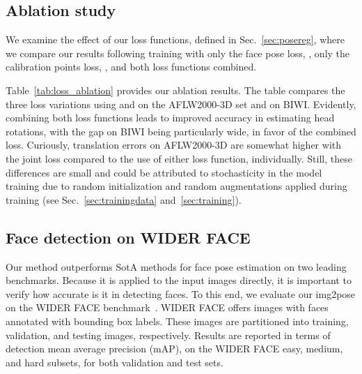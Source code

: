 \documentclass[final]{cvpr}
\begin{document}
\subsection{Ablation study}\label{sec:append:ablation}
We examine the effect of our loss functions, defined in Sec.~\ref{sec:posereg}, where we compare our results following training with only the face pose loss, , only the calibration points loss, , and both loss functions combined.

Table~\ref{tab:loss_ablation} provides our ablation results. The table compares the three loss variations using  and  on the AFLW2000-3D set and  on BIWI. Evidently, combining both loss functions leads to improved accuracy in estimating head rotations, with the gap on BIWI being particularly wide, in favor of the combined loss. Curiously, translation errors on AFLW2000-3D are somewhat higher with the joint loss compared to the use of either loss function, individually. Still, these differences are small and could be attributed to stochasticity in the model training due to random initialization and random augmentations applied during training (see Sec.~\ref{sec:trainingdata} and~\ref{sec:training}).

\begin{table}[t]
    \centering
    \caption{Comparison of the effects of different loss functions on the pose estimation results obtained on the AFLW2000-3D and BIWI benchmarks. MAE and MAE are the rotational and translational MAE, respectively.}
    \label{tab:loss_ablation}\vspace{-5mm}
\end{table}

\subsection{Face detection on WIDER FACE}\label{sec:WIDER}
Our method outperforms SotA methods for face pose estimation on two leading benchmarks. Because it is applied to the input images directly, it is important to verify how accurate is it in detecting faces. To this end, we evaluate our img2pose on the WIDER FACE benchmark~\cite{wider_face}. WIDER FACE offers  images with  faces annotated with bounding box labels. These images are partitioned into  training,  validation, and  testing images, respectively. Results are reported in terms of detection mean average precision (mAP), on the WIDER FACE easy, medium, and hard subsets, for both validation and test sets.
\end{document}
